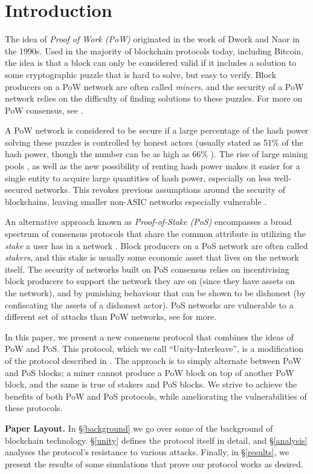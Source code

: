 \section{Introduction}
\label{intro}

The idea of \emph{Proof of Work (PoW)} originated in the work of Dwork and Naor
in the 1990s\cite{dwork-naor}. Used in the majority of blockchain protocols today, including
Bitcoin, the idea is that a block can only be considered valid if it includes
a solution to some cryptographic puzzle that is hard to solve, but easy to verify. 
Block producers on a PoW network are often called \emph{miners}, and 
the security of a PoW network relies on the difficulty of finding solutions
to these puzzles. For more on PoW consensus, see \cite{nakamoto2008}.

A PoW network is considered to be secure if a large percentage of the hash power
solving these puzzles is controlled by honest actors (usually stated as 51\% of the hash power,
though the number can be as high as 66\% \cite{selfish_mining}). 
The rise of large mining pools \cite{aliaga2018}, as well as the new possibility of renting
hash power makes it easier for a single entity to acquire large quantities of hash power,
especially on less well-secured networks. This revokes previous assumptions around
the security of blockchains, leaving smaller non-ASIC networks especially vulnerable \cite{sinnige2018}.

An alternative approach known as \emph{Proof-of-Stake (PoS)} encompasses a broad spectrum of
consensus protocols that share the common attribute in utilizing the \textit{stake} a user has in a network \cite{BentovGM14}.
Block producers on a PoS network are often called \emph{stakers}, and 
this stake is usually some economic asset that lives on the network itself.
The security of networks built on PoS consensus relies on incentivising block producers
to support the network they are on (since they have assets on the network), and by 
punishing behaviour that can be shown to be dishonest (by confiscating the assets of
a dishonest actor). PoS networks are vulnerable to a different set of attacks than PoW networks,
see \cite{brown2018formal} for more.

In this paper, we present a new consensus protocol that combines the ideas
of PoW and PoS. This protocol, which we call ``Unity-Interleave'', is a modification
of the protocol described in \cite{wu2019unifying}.
The approach is to simply alternate between PoW and PoS blocks; a miner
cannot produce a PoW block on top of another PoW block, and the same is
true of stakers and PoS blocks. We strive to achieve the benefits of both PoW and
PoS protocols, while ameliorating the vulnerabilities of these protocols.

\textbf{Paper Layout.} In \S\ref{background} we go over some of the background of blockchain technology.
\S\ref{unity} defines the protocol itself in detail, and \S\ref{analysis} 
analyses the protocol's resistance to various attacks. Finally, in \S\ref{results},
we present the results of some simulations that prove our protocol works as desired.